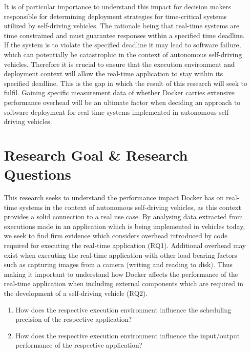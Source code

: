 It is of particular importance to understand this impact for decision makers responsible for determining deployment strategies for time-critical systems utilized by self-driving vehicles. The rationale being that real-time systems are time constrained and must guarantee responses within a specified time deadline. If the system is to violate the specified deadline it may lead to software failure, which can potentially be catastrophic in the context of autonomous self-driving vehicles. Therefore it is crucial to ensure that the execution environment and deployment context will allow the real-time application to stay within its specified deadline. This is the gap in which the result of this research will seek to fulfil. Gaining specific measurement data of whether Docker carries extensive performance overhead will be an ultimate factor when deciding an approach to software deployment for real-time systems implemented in autonomous self-driving vehicles.\\

\section{Research Goal \& Research Questions}
This research seeks to understand the performance impact Docker has on real-time systems in the context of autonomous self-driving vehicles, as this context provides a solid connection to a real use case. By analysing data extracted from executions made in an application which is being implemented in vehicles today, we seek to find firm evidence which considers overhead introduced by code required for executing the real-time application (RQ1). Additional overhead may exist when executing the real-time application with other load bearing factors such as capturing images from a camera (writing and reading to disk). Thus making it important to understand how Docker affects the performance of the real-time application when including external components which are required in the development of a self-driving vehicle (RQ2).\\

\begin{enumerate}[label=\textbf{RQ\arabic*}]
\label{section:rqs}
	\item How does the respective execution environment influence the scheduling precision of the respective application?
	\item How does the respective execution environment influence the input/output performance of the respective application?\\
\end{enumerate}



